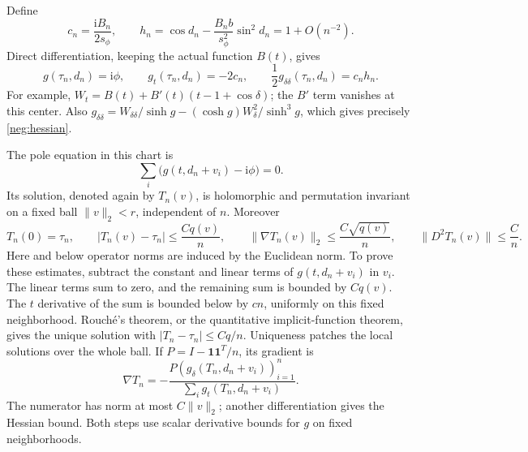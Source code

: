 \documentclass[11pt]{article}
\numberwithin{equation}{section}
\theoremstyle{definition}
\newcommand{\ii}{\mathrm i}
\begin{document}
Define
\begin{equation}
 c_n=\frac{\ii B_n}{2s_\phi},\qquad
 h_n=\cos d_n-\frac{B_n b}{s_\phi^2}\sin^2d_n
       =1+O(n^{-2}).
 \label{neg:hessian}
\end{equation}
Direct differentiation, keeping the actual function \(B(t)\), gives
\begin{equation}
 g(\tau_n,d_n)=\ii\phi,\qquad
 g_t(\tau_n,d_n)=-2c_n,\qquad
 \frac12g_{\delta\delta}(\tau_n,d_n)=c_n h_n .
 \label{neg:center-derivatives}
\end{equation}
For example, \(W_t=B(t)+B'(t)(t-1+\cos\delta)\); the
\(B'\) term vanishes at this center.  Also
\(g_{\delta\delta}=W_{\delta\delta}/\sinh g
-(\cosh g)W_\delta^2/\sinh^3g\), which gives precisely
\eqref{neg:hessian}.

The pole equation in this chart is
\[
 \sum_i\bigl(g(t,d_n+v_i)-\ii\phi\bigr)=0 .
 \]
Its solution, denoted again by \(T_n(v)\), is holomorphic and
permutation invariant on a fixed ball \(\|v\|_2<r\), independent
of \(n\).  Moreover
\begin{equation}
 T_n(0)=\tau_n,\qquad
 |T_n(v)-\tau_n|\le\frac{Cq(v)}n,\qquad
 \|\nabla T_n(v)\|_2\le\frac{C\sqrt{q(v)}}n,\qquad
 \|D^2T_n(v)\|\le\frac Cn .
 \label{neg:implicit-estimates}
\end{equation}
Here and below operator norms are induced by the Euclidean norm.
To prove these estimates, subtract the constant and linear terms
of \(g(t,d_n+v_i)\) in \(v_i\).  The linear terms sum to zero,
and the remaining sum is bounded by \(Cq(v)\).  The \(t\)
derivative of the sum is bounded below by \(cn\), uniformly on
this fixed neighborhood.  Rouch\'e's theorem, or the quantitative
implicit-function theorem, gives the unique solution with
\(|T_n-\tau_n|\le Cq/n\).  Uniqueness patches the local solutions
over the whole ball.  If
\(P=I-\mathbf1\mathbf1^T/n\), its gradient is
\[
 \nabla T_n
 =-\frac{P(g_\delta(T_n,d_n+v_i))_{i=1}^n}
          {\sum_i g_t(T_n,d_n+v_i)} .
 \]
The numerator has norm at most \(C\|v\|_2\); another
differentiation gives the Hessian bound. Both steps use scalar
derivative bounds for \(g\) on fixed neighborhoods.
\end{document}
